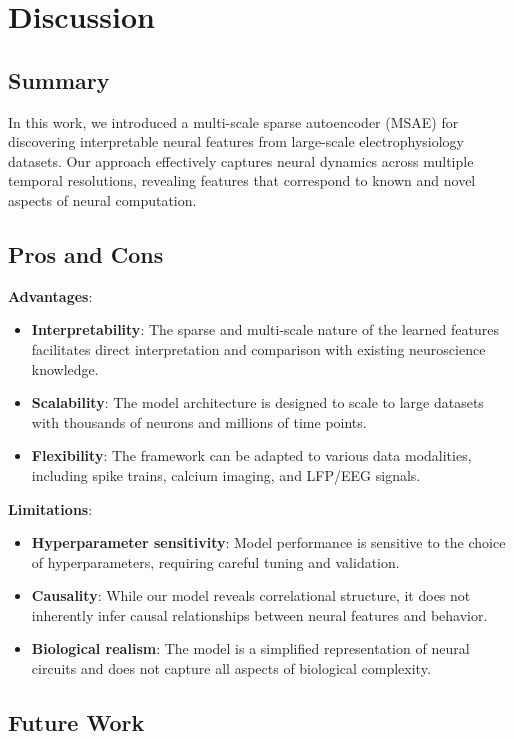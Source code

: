 \section{Discussion}

\subsection{Summary}

In this work, we introduced a multi-scale sparse autoencoder (MSAE) for discovering interpretable neural features from large-scale electrophysiology datasets. Our approach effectively captures neural dynamics across multiple temporal resolutions, revealing features that correspond to known and novel aspects of neural computation.

\subsection{Pros and Cons}

\textbf{Advantages}:
\begin{itemize}
    \item \textbf{Interpretability}: The sparse and multi-scale nature of the learned features facilitates direct interpretation and comparison with existing neuroscience knowledge.
    \item \textbf{Scalability}: The model architecture is designed to scale to large datasets with thousands of neurons and millions of time points.
    \item \textbf{Flexibility}: The framework can be adapted to various data modalities, including spike trains, calcium imaging, and LFP/EEG signals.
\end{itemize}

\textbf{Limitations}:
\begin{itemize}
    \item \textbf{Hyperparameter sensitivity}: Model performance is sensitive to the choice of hyperparameters, requiring careful tuning and validation.
    \item \textbf{Causality}: While our model reveals correlational structure, it does not inherently infer causal relationships between neural features and behavior.
    \item \textbf{Biological realism}: The model is a simplified representation of neural circuits and does not capture all aspects of biological complexity.
\end{itemize}

\subsection{Future Work}

